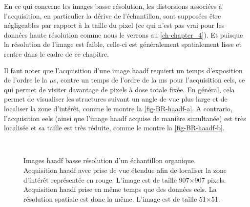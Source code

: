 En ce qui concerne les images basse résolution, les distorsions associées à l'acquisition, en particulier la dérive de l'échantillon, sont supposées être négligeables par rapport à la taille du pixel (ce qui n'est pas vrai pour les données haute résolution comme nous le verrons au \cref{ch-chapter_4}). Et puisque la résolution de l'image est faible, celle-ci est généralement spatialement lisse et rentre dans le cadre de ce chapitre.

Il faut noter que l'acquisition d'une image \gls{haadf} requiert un temps d'exposition de l'ordre le la $\mu$s, contre un temps de l'ordre de la ms pour l'acquisition \gls{eels}, ce qui permet de visiter davantage de pixels à dose totale fixée. En général, cela permet de visualiser les structures suivant un angle de vue plus large et de localiser la zone d'intérêt, comme le montre la \cref{fig-BR-haadf-a}. A contrario, l'acquisition \gls{eels} (ainsi que l'image \gls{haadf} acquise de manière simultanée) est très localisée et sa taille est très réduite, comme le montre la \cref{fig-BR-haadf-b}.

\begin{figure}[t]
    \centering
    \hspace{1em}
    \\
    \caption{\protect\label{fig-BR-haadf}
        Images \gls{haadf} basse résolution d'un échantillon organique. 
         Acquisition \gls{haadf} avec prise de vue étendue afin de localiser la zone d'intérêt représentée en rouge. L'image est de taille 907$\times$907 pixels. 
         Acquisition \gls{haadf} prise en même temps que des données \gls{eels}. La résolution spatiale est donc la même. L'image est de taille 51$\times$51. 
    }
\end{figure}


